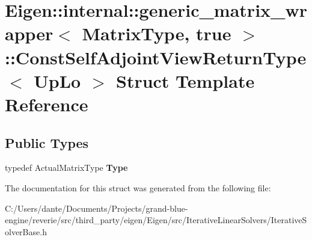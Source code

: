 \hypertarget{struct_eigen_1_1internal_1_1generic__matrix__wrapper_3_01_matrix_type_00_01true_01_4_1_1_const_self_adjoint_view_return_type}{}\section{Eigen\+::internal\+::generic\+\_\+matrix\+\_\+wrapper$<$ Matrix\+Type, true $>$\+::Const\+Self\+Adjoint\+View\+Return\+Type$<$ Up\+Lo $>$ Struct Template Reference}
\label{struct_eigen_1_1internal_1_1generic__matrix__wrapper_3_01_matrix_type_00_01true_01_4_1_1_const_self_adjoint_view_return_type}
\subsection*{Public Types}
\begin{DoxyCompactItemize}
\item 
\mbox{\label{struct_eigen_1_1internal_1_1generic__matrix__wrapper_3_01_matrix_type_00_01true_01_4_1_1_const_self_adjoint_view_return_type_a1be9ca02c8eb212030b2239d6b12da23}} 
typedef Actual\+Matrix\+Type {\bfseries Type}
\end{DoxyCompactItemize}


The documentation for this struct was generated from the following file\+:\begin{DoxyCompactItemize}
\item 
C\+:/\+Users/dante/\+Documents/\+Projects/grand-\/blue-\/engine/reverie/src/third\+\_\+party/eigen/\+Eigen/src/\+Iterative\+Linear\+Solvers/Iterative\+Solver\+Base.\+h\end{DoxyCompactItemize}
